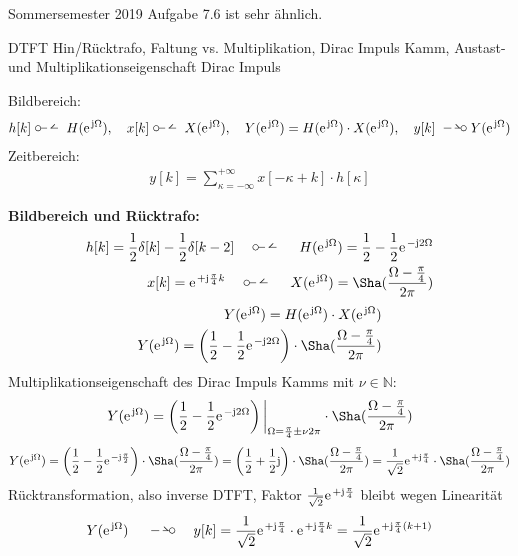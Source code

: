 Sommersemester 2019 Aufgabe 7.6 ist sehr ähnlich.
\begin{Werkzeug}
DTFT Hin/Rücktrafo, Faltung vs. Multiplikation, Dirac Impuls Kamm,
Austast- und Multiplikationseigenschaft Dirac Impuls
\end{Werkzeug}
\begin{Ansatz}
Bildbereich:
\begin{align}
h[k]\dtft H(\e^{\im\Omega}),\quad x[k]\dtft X(\e^{\im\Omega}),\quad
Y(\e^{\im\Omega}) = H(\e^{\im\Omega}) \cdot X(\e^{\im\Omega}),\quad
y[k] \DTFT Y(\e^{\im\Omega})
\end{align}
Zeitbereich:
\begin{align}
y[k] = \sum_{\kappa=-\infty}^{+\infty} x[-\kappa + k] \cdot h[\kappa]
\end{align}
\end{Ansatz}
\begin{ExCalc}
\textbf{Bildbereich und Rücktrafo:}
\begin{align}
h[k] = \frac{1}{2}\delta[k] - \frac{1}{2}\delta[k-2]\quad\dtft\quad
H(\e^{\im\Omega}) = \frac{1}{2} - \frac{1}{2} \e^{-\im 2 \Omega}\\
x[k]=\e^{+\im \frac{\pi}{4} k} \quad\dtft\quad
X(\e^{\im\Omega}) = \Sha(\frac{\Omega-\frac{\pi}{4}}{2\pi})
\end{align}
%
\begin{align}
Y(\e^{\im\Omega}) = H(\e^{\im\Omega}) \cdot X(\e^{\im\Omega})\\
Y(\e^{\im\Omega}) = \left(\frac{1}{2} - \frac{1}{2} \e^{-\im 2 \Omega}\right)
\cdot
\Sha(\frac{\Omega-\frac{\pi}{4}}{2\pi})
\end{align}
Multiplikationseigenschaft des Dirac Impuls Kamms mit $\nu\in\mathbb{N}$:
\begin{align}
Y(\e^{\im\Omega}) = \left(\frac{1}{2} - \frac{1}{2} \e^{-\im 2 \Omega}\right)\bigg|_{\Omega=\frac{\pi}{4}\pm\nu 2\pi}
\cdot
\Sha(\frac{\Omega-\frac{\pi}{4}}{2\pi})
\end{align}
\begin{align}
Y(\e^{\im\Omega}) = \left(\frac{1}{2} - \frac{1}{2} \e^{-\im \frac{\pi}{2}}\right)
\cdot
\Sha(\frac{\Omega-\frac{\pi}{4}}{2\pi}) =
\left(\frac{1}{2} + \frac{1}{2} \im \right)
\cdot
\Sha(\frac{\Omega-\frac{\pi}{4}}{2\pi}) =
\frac{1}{\sqrt{2}} \e^{+\im\frac{\pi}{4}}\cdot\Sha(\frac{\Omega-\frac{\pi}{4}}{2\pi})
\end{align}
Rücktransformation, also inverse DTFT, Faktor $\frac{1}{\sqrt{2}} \e^{+\im\frac{\pi}{4}}$ bleibt wegen Linearität
\begin{align}
Y(\e^{\im\Omega}) \quad\DTFT\quad y[k] = \frac{1}{\sqrt{2}} \e^{+\im\frac{\pi}{4}} \cdot \e^{+\im \frac{\pi}{4} k}=
\frac{1}{\sqrt{2}} \e^{+\im \frac{\pi}{4} (k+1)}
\end{align}


\end{ExCalc}
